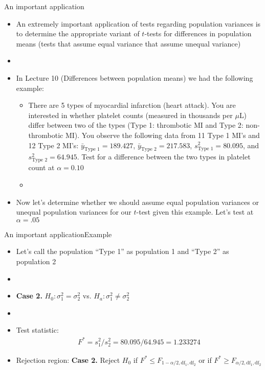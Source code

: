 \documentclass[xcolor=dvipsnames]{beamer}
\begin{document}
\begin{frame}{An important application}
	\begin{itemize}
		\item An extremely important application of tests regarding population variances is to determine the appropriate variant of $t$-tests for differences in population means (tests that assume equal variance that assume unequal variance)
		\item[]
		\item In Lecture 10 (Differences between population means) we had the following example: 
		\begin{itemize}
			\item {\tiny There are 5 types of myocardial infarction (heart attack). You are interested in whether platelet counts (measured in thousands per $\mu$L) differ between two of the types (Type 1: thrombotic MI and Type 2: non-thrombotic MI). You observe the following data from 11 Type 1 MI's and 12 Type 2 MI's: $\bar{y}_{\text{Type 1}}=189.427$, $\bar{y}_{\text{Type 2}}=217.583$, $s_{\text{Type 1}}^2 = 80.095$, and $s_{\text{Type 2}}^2 = 64.945$. Test for a difference between the two types in platelet count at $\alpha = 0.10$}
			\item[]
		\end{itemize}
	\item Now let's determine whether we should assume equal population variances or unequal population variances for our $t$-test given this example. Let's test at $\alpha = .05$
	\end{itemize}
\end{frame}

\begin{frame}{An important application}{Example}
	\begin{itemize}
		\item Let's call the population ``Type 1'' as population 1 and ``Type 2'' as population 2 \pause
		\item[]
		\item \textbf{Case 2.} $H_0: \sigma_1^2 = \sigma_2^2$ vs. $H_a: \sigma_1^2 \neq \sigma_2^2$ \pause
		\item[]
		\item Test statistic:
		\begin{gather*}
		F^* = s_1^2 /s_2^2 =  80.095 / 64.945 = 1.233274 
		\end{gather*}\pause
		\item Rejection region: \textbf{Case 2.} Reject $H_0$ if $F^* \leq F_{1-\alpha / 2, \text{df}_1,\text{df}_2}$ or if $F^* \geq F_{\alpha / 2, \text{df}_1,\text{df}_2} $
	\end{itemize}
\end{frame}
\end{document}
